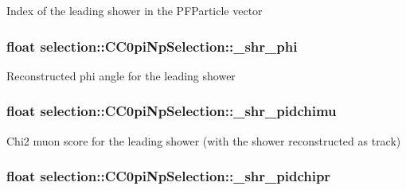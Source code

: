 Index of the leading shower in the P\-F\-Particle vector \hypertarget{classselection_1_1CC0piNpSelection_a8706a83b3dc2e2c3857ada556392f16f}{
\subsubsection[{\-\_\-shr\-\_\-phi}]{\setlength{\rightskip}{0pt plus 5cm}float selection\-::\-C\-C0pi\-Np\-Selection\-::\-\_\-shr\-\_\-phi\hspace{0.3cm}{\ttfamily [private]}}}\label{classselection_1_1CC0piNpSelection_a8706a83b3dc2e2c3857ada556392f16f}
Reconstructed phi angle for the leading shower \hypertarget{classselection_1_1CC0piNpSelection_a63840908c268c89d30e6728ac6cb1036}{
\subsubsection[{\-\_\-shr\-\_\-pidchimu}]{\setlength{\rightskip}{0pt plus 5cm}float selection\-::\-C\-C0pi\-Np\-Selection\-::\-\_\-shr\-\_\-pidchimu\hspace{0.3cm}{\ttfamily [private]}}}\label{classselection_1_1CC0piNpSelection_a63840908c268c89d30e6728ac6cb1036}
Chi2 muon score for the leading shower (with the shower reconstructed as track) \hypertarget{classselection_1_1CC0piNpSelection_aae9294d7e4803ff991e611ea124769bc}{
\subsubsection[{\-\_\-shr\-\_\-pidchipr}]{\setlength{\rightskip}{0pt plus 5cm}float selection\-::\-C\-C0pi\-Np\-Selection\-::\-\_\-shr\-\_\-pidchipr\hspace{0.3cm}{\ttfamily [private]}}}\label{classselection_1_1CC0piNpSelection_aae9294d7e4803ff991e611ea124769bc}
